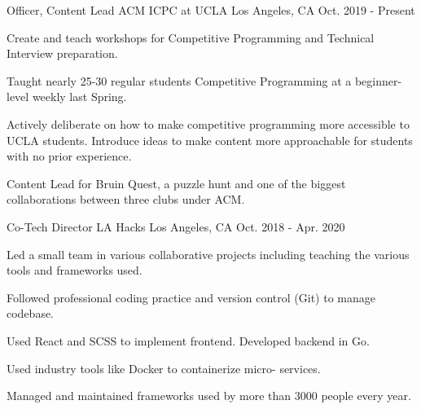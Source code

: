 

\begin{cventries}

\cventry
{Officer, Content Lead} %
{ACM ICPC at UCLA} %
{Los Angeles, CA} %
{Oct. 2019 - Present} %
{
  \begin{cvitems} %
    \item{Create and teach workshops for Competitive Programming and Technical Interview preparation.}
    \item{Taught nearly 25-30 regular
students Competitive Programming at a beginner-level weekly last Spring.}
    \item{Actively deliberate on how to make competitive programming more accessible to UCLA students. Introduce ideas to make content more approachable for students with no prior experience.}
    \item{Content Lead for Bruin Quest, a puzzle hunt and one of the biggest collaborations between three clubs under ACM.}
  \end{cvitems}
}


\cventry
    {Co-Tech Director} %
    {LA Hacks} %
    {Los Angeles, CA} %
    {Oct. 2018 - Apr. 2020} %
    {
      \begin{cvitems} %
        \item{Led a small team in various collaborative projects including teaching the various tools and frameworks used.}
        \item{Followed professional coding practice and version control (Git) to manage codebase.}
        \item{Used React and SCSS to implement frontend. Developed backend in Go.}
        \item{Used industry tools like Docker to containerize micro-
        services.}
        \item{Managed and maintained frameworks used by more than 3000 people every year.}
      \end{cvitems}
    }


\end{cventries}
